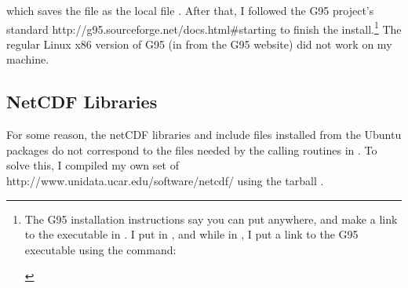 \begin{codeblock}
\end{codeblock}

which saves the  file as the local file .
After that, I followed the G95 project's standard
%
	{%
		{http://g95.sourceforge.net/docs.html#starting}}
to finish the install.\footnote%
	{The G95 installation instructions say you can put
	 anywhere, and make a link to the
	executable  in
	.  I put  in
	, and while in , 
	I put a link to the G95 executable using the command:
	\begin{codeblock}
	\end{codeblock}}
The regular Linux x86 version of G95
(in  from the G95 website) did not work on my
machine.




\subsection{NetCDF Libraries}   \label{sec:ubuntu.netcdf}

%

For some reason, the netCDF libraries and include files
installed from the Ubuntu packages do not
correspond to the files needed
by the calling routines in .  To solve this, I compiled
my own set of
%
        {http://www.unidata.ucar.edu/software/netcdf/}
using the tarball
%
        {}.

